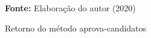 \begin{figure}[ht!]
\centering

\caption{\textmd{Retorno do método aprova-candidatos}}
\label{fig:retaprovacandidatos}

\par\medskip\textbf{Fonte:} Elaboração do autor (2020) \par\medskip

\end{figure}
